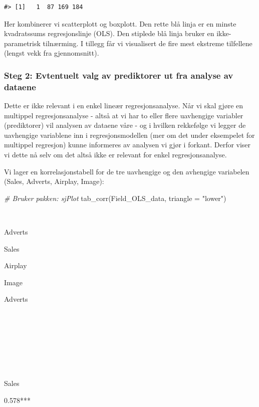 \documentclass[
]{article}
\newenvironment{Shaded}{\begin{snugshade}}{\end{snugshade}}
\newcommand{\AttributeTok}[1]{\textcolor[rgb]{0.77,0.63,0.00}{#1}}
\newcommand{\CommentTok}[1]{\textcolor[rgb]{0.56,0.35,0.01}{\textit{#1}}}
\newcommand{\FunctionTok}[1]{\textcolor[rgb]{0.00,0.00,0.00}{#1}}
\newcommand{\NormalTok}[1]{#1}
\newcommand{\StringTok}[1]{\textcolor[rgb]{0.31,0.60,0.02}{#1}}
\begin{document}
\begin{verbatim}
#> [1]   1  87 169 184
\end{verbatim}

Her kombinerer vi scatterplott og boxplott. Den rette blå linja er en minste kvadratssums regresjonslinje (OLS). Den stiplede blå linja bruker en ikke-parametrisk tilnærming. I tillegg får vi visualisert de fire mest ekstreme tilfellene (lengst vekk fra gjennomsnitt).

\hypertarget{steg-2-evtentuelt-valg-av-prediktorer-ut-fra-analyse-av-dataene}{%
\subsubsection{Steg 2: Evtentuelt valg av prediktorer ut fra analyse av dataene}\label{steg-2-evtentuelt-valg-av-prediktorer-ut-fra-analyse-av-dataene}}

Dette er ikke relevant i en enkel lineær regresjonsanalyse. Når vi skal gjøre en multippel regresjonsanalyse - altså at vi har to eller flere uavhengige variabler (prediktorer) vil analysen av dataene våre - og i hvilken rekkefølge vi legger de uavhengige variablene inn i regresjonsmodellen (mer om det under eksempelet for multippel regresjon) kunne informeres av analysen vi gjør i forkant. Derfor viser vi dette nå selv om det altså ikke er relevant for enkel regresjonsanalyse.

Vi lager en korrelasjonstabell for de tre uavhengige og den avhengige variabelen (Sales, Adverts, Airplay, Image):

\begin{Shaded}
\begin{Highlighting}[]
\CommentTok{\# Bruker pakken: sjPlot}
\FunctionTok{tab\_corr}\NormalTok{(Field\_OLS\_data, }\AttributeTok{triangle =} \StringTok{"lower"}\NormalTok{)}
\end{Highlighting}
\end{Shaded}

~

Adverts

Sales

Airplay

Image

Adverts

~

~

~

~

Sales

0.578***

~
\end{document}

